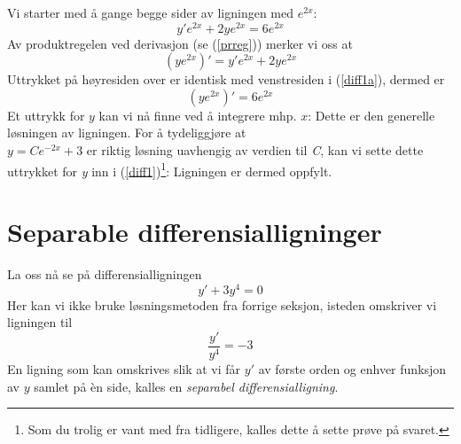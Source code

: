 Vi starter med å gange begge sider av ligningen med $ e^{2x} $:
\begin{equation}
y'e^{2x}+2ye^{2x}=6e^{2x} \label{diff1a}
\end{equation}
Av produktregelen ved derivasjon (se (\ref{prreg})) merker vi oss at
\[ \left(ye^{2x}\right)'=y'e^{2x}+2ye^{2x} \]
Uttrykket på høyresiden over er identisk med venstresiden i (\ref{diff1a}), dermed er
\[ \left(ye^{2x}\right)'= 6e^{2x}\]
Et uttrykk for $ y $ kan vi nå finne ved å integrere mhp. $ x $:
Dette er den generelle løsningen av ligningen. For å tydeliggjøre at\\ $ y= {Ce^{-2x} +3} $ er riktig løsning uavhengig av verdien til \textit{C}, kan vi sette dette uttrykket for \textit{y} inn i (\ref{diff1})\footnote{Som du trolig er vant med fra tidligere, kalles dette å sette prøve på svaret.}:
Ligningen er dermed oppfylt.\regv
\newpage
\fode
\fodee
{}
\section{Separable differensialligninger}
La oss nå se på differensialligningen \[ y'+3y^4= 0 \]
Her kan vi ikke bruke løsningsmetoden fra forrige seksjon, isteden omskriver vi ligningen til
\[ \frac{y'}{y^4}=-3 \]
En ligning som kan omskrives slik at vi får $ y' $ av første orden og enhver funksjon av $ y $ samlet på èn side, kalles en \textit{separabel differensialligning}.\vsk

